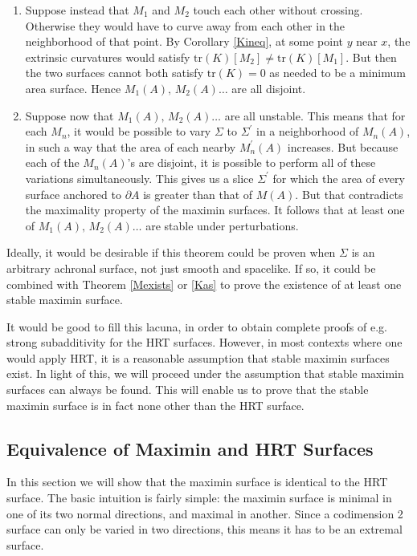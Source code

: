 \documentclass{article}
\begin{document}
\begin{enumerate}[resume]
\begin{enumerate}
\begin{figure}[hbt]
\end{figure}
	\item Suppose instead that $M_1$ and $M_2$ touch each other without crossing.  Otherwise they would have to curve away from each other in the neighborhood of that point.  By Corollary \ref{Kineq}, at some point $y$ near $x$, the extrinsic curvatures would satisfy 
$\mathrm{tr}(K)[M_2] \ne \mathrm{tr}(K)[M_1]$.  But then the two surfaces cannot both satisfy $\mathrm{tr}(K) = 0$ as needed to be a minimum area surface.  Hence $M_1(A),\,M_2(A)\ldots$ are all disjoint.
	\item Suppose now that $M_1(A),\,M_2(A)\ldots$ are all unstable.  This means that for each $M_n$, it would be possible to vary $\Sigma$ to $\Sigma^\prime$ in a neighborhood of $M_n(A)$, in such a way that the area of each nearby $M_n^\prime(A)$ increases.  But because each of the $M_n(A)$'s are disjoint, it is possible to perform all of these variations simultaneously.  This gives us a slice $\Sigma^\prime$ for which the area of every surface anchored to $\partial A$ is greater than that of $M(A)$.  But that contradicts the maximality property of the maximin surfaces.  It follows that at least one of $M_1(A),\,M_2(A)\ldots$ are stable under perturbations.
	\end{enumerate}
\end{enumerate}
Ideally, it would be desirable if this theorem could be proven when $\Sigma$ is an arbitrary achronal surface, not just smooth and spacelike.  If so, it could be combined with Theorem \ref{Mexists} or \ref{Kas} to prove the existence of at least one stable maximin surface.  

It would be good to fill this lacuna, in order to obtain complete proofs of e.g. strong subadditivity for the HRT surfaces.  However, in most contexts where one would apply HRT, it is a reasonable assumption that stable maximin surfaces exist.  In light of this, we will proceed under the assumption that stable maximin surfaces can always be found.  This will enable us to prove that the stable maximin surface is in fact none other than the HRT surface.

\subsection{Equivalence of Maximin and HRT Surfaces}\label{equiv}

In this section we will show that the maximin surface is identical to the HRT surface.  The basic intuition is fairly simple: the maximin surface is minimal in one of its two normal directions, and maximal in another.  Since a codimension 2 surface can only be varied in two directions, this means it has to be an extremal surface.
\end{document}
